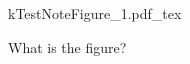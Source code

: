 \documentclass[12pt]{article}
\newcommand{\incfig}[1]{%
    \def\svgwidth{\columnwidth}
    {#1.pdf_tex}
}
\begin{document}

\begin{figure}[H]
    \centering
    \incfig{kTestNoteFigure_1}
    \caption{What is the figure?}
    \label{fig:kTestNoteFigure_1}
\end{figure}
\end{document}
